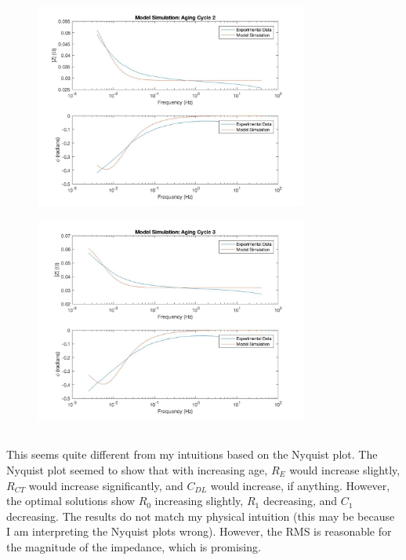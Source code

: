 \documentclass[a4paper,12pt]{extarticle}
\begin{document}
\begin{figure}[h]
\centering
\includegraphics[width=0.8\textwidth]{cycle2_model.jpg}
\end{figure}

\pagebreak

\begin{figure}[h]
\centering
\includegraphics[width=0.8\textwidth]{cycle3_model.jpg}
\end{figure}

\subsection{}

This seems quite different from my intuitions based on the Nyquist plot. The Nyquist plot seemed to show that with increasing age, \(R_E\) would increase slightly, \(R_{CT}\) would increase significantly, and \(C_{DL}\) would increase, if anything. However, the optimal solutions show \(R_0\) increasing slightly, \(R_1\) decreasing, and \(C_1\) decreasing. The results do not match my physical intuition (this may be because I am interpreting the Nyquist plots wrong). However, the RMS is reasonable for the magnitude of the impedance, which is promising. 
\end{document}
